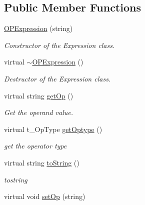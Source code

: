 \subsection*{Public Member Functions}
\begin{DoxyCompactItemize}
\item 
\hypertarget{classOPExpression_a5784034daef8568869fe0bb5ecfbcdcf}{
\hyperlink{classOPExpression_a5784034daef8568869fe0bb5ecfbcdcf}{OPExpression} (string)}
\label{classOPExpression_a5784034daef8568869fe0bb5ecfbcdcf}

\begin{DoxyCompactList}\small\item\em Constructor of the Expression class. \item\end{DoxyCompactList}\item 
\hypertarget{classOPExpression_a5ea892d89208ccb593510ee63ef42a19}{
virtual \hyperlink{classOPExpression_a5ea892d89208ccb593510ee63ef42a19}{$\sim$OPExpression} ()}
\label{classOPExpression_a5ea892d89208ccb593510ee63ef42a19}

\begin{DoxyCompactList}\small\item\em Destructor of the Expression class. \item\end{DoxyCompactList}\item 
virtual string \hyperlink{classOPExpression_a7b095019f9c2138f1f6bfd21bf4348d9}{getOp} ()
\begin{DoxyCompactList}\small\item\em Get the operand value. \item\end{DoxyCompactList}\item 
virtual t\_\-OpType \hyperlink{classOPExpression_a26efe8d14f0d37157c885ff16988be30}{getOptype} ()
\begin{DoxyCompactList}\small\item\em get the operator type \item\end{DoxyCompactList}\item 
virtual string \hyperlink{classOPExpression_a6a29cfb44936766a61099835482ea6d1}{toString} ()
\begin{DoxyCompactList}\small\item\em tostring \item\end{DoxyCompactList}\item 
\hypertarget{classOPExpression_a5bfc431b31030e3439bda2c7648374b0}{
virtual void \hyperlink{classOPExpression_a5bfc431b31030e3439bda2c7648374b0}{setOp} (string)}
\label{classOPExpression_a5bfc431b31030e3439bda2c7648374b0}


\end{DoxyCompactItemize}
